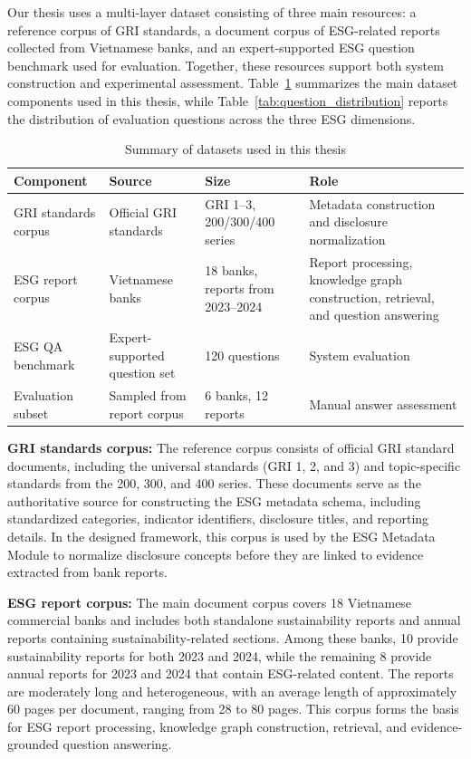 \documentclass[sn-mathphys, oneside]{sn-jnl}
\begin{document}
Our thesis uses a multi-layer dataset consisting of three main resources: a reference
corpus of GRI standards, a document corpus of ESG-related reports collected from
Vietnamese banks, and an expert-supported ESG question benchmark used for evaluation.
Together, these resources support both system construction and experimental assessment.
Table~\ref{tab:dataset_summary} summarizes the main dataset components used in this thesis,
while Table~\ref{tab:question_distribution} reports the distribution of evaluation
questions across the three ESG dimensions.
\begin{table}[htbp]
\centering
\caption{Summary of datasets used in this thesis}
\label{tab:dataset_summary}
\begin{tabular}{p{3.8cm}p{3.0cm}p{2.4cm}p{5.0cm}}
\toprule
\textbf{Component} & \textbf{Source} & \textbf{Size} & \textbf{Role} \\
\midrule
GRI standards corpus & Official GRI standards & GRI 1--3, 200/300/400 series & Metadata construction and disclosure normalization \\
ESG report corpus & Vietnamese banks & 18 banks, reports from 2023--2024 & Report processing, knowledge graph construction, retrieval, and question answering \\
ESG QA benchmark & Expert-supported question set & 120 questions & System evaluation \\
Evaluation subset & Sampled from report corpus & 6 banks, 12 reports & Manual answer assessment \\
\bottomrule
\end{tabular}
\end{table}

\textbf{GRI standards corpus:} The reference corpus consists of official GRI standard documents, including the
universal standards (GRI 1, 2, and 3) and topic-specific standards from the
200, 300, and 400 series. These documents serve as the authoritative source for
constructing the ESG metadata schema, including standardized categories, indicator
identifiers, disclosure titles, and reporting details. In the designed framework,
this corpus is used by the ESG Metadata Module to normalize disclosure concepts
before they are linked to evidence extracted from bank reports.


\textbf{ESG report corpus:} The main document corpus covers 18 Vietnamese commercial banks and includes both
standalone sustainability reports and annual reports containing sustainability-related
sections. Among these banks, 10 provide sustainability reports for both 2023 and 2024,
while the remaining 8 provide annual reports for 2023 and 2024 that contain ESG-related
content. The reports are moderately long and heterogeneous, with an average length of
approximately 60 pages per document, ranging from 28 to 80 pages. This corpus forms
the basis for ESG report processing, knowledge graph construction, retrieval, and
evidence-grounded question answering.
\end{document}
